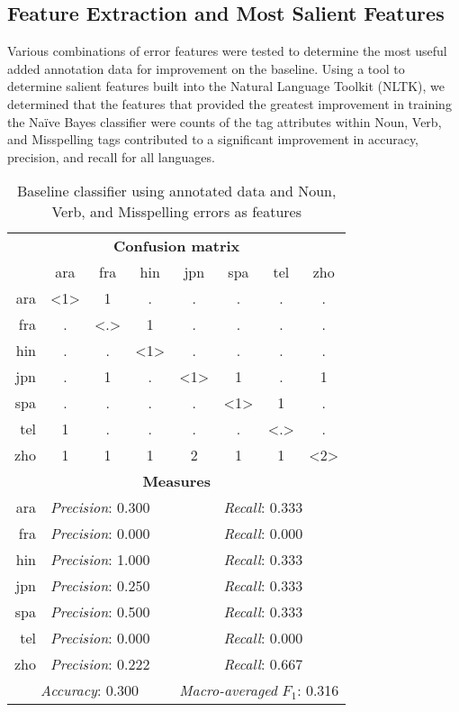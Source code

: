 \documentclass[10pt, a4paper]{article}
\begin{document}
\subsection{Feature Extraction and Most Salient Features}
Various combinations of error features were tested to determine the most useful added annotation data for improvement on the baseline. Using a tool to determine salient features built into the Natural Language Toolkit (NLTK), we determined that the features that provided the greatest improvement in training the Na\"ive Bayes classifier were counts of the tag attributes within Noun, Verb, and Misspelling tags contributed to a significant improvement in accuracy, precision, and recall for all languages. 

\begin{table}[!h]
	\begin{center}
		\begin{tabular}{r|c|c|c|c|c|c|c}	
			\multicolumn{8}{c}{\textbf{Confusion matrix}}\\
			~&ara & fra & hin & jpn & spa & tel & zho\\
			\hline
			ara & <1> & 1 & . & . & . & . & . \\
			fra & . & <.> & 1 & . & . & . & . \\
			hin & . & . & <1> & . & . & . & . \\
			jpn & . & 1 & . & <1> & 1 & . & 1 \\
			spa & . & . & . & . & <1> & 1 & . \\
			tel & 1 & . & . & . & . & <.> & . \\
			zho & 1 & 1 & 1 & 2 & 1 & 1 & <2> \\
			
			\multicolumn{8}{c}{\textbf{Measures}}\\
			ara & \multicolumn{4}{l}{\textit{Precision}: 0.300} & \multicolumn{3}{l}{\textit{Recall}: 0.333}	\\
			fra & \multicolumn{4}{l}{\textit{Precision}: 0.000} & \multicolumn{3}{l}{\textit{Recall}: 0.000}	\\
			hin & \multicolumn{4}{l}{\textit{Precision}: 1.000} & \multicolumn{3}{l}{\textit{Recall}: 0.333}	\\
			jpn & \multicolumn{4}{l}{\textit{Precision}: 0.250} & \multicolumn{3}{l}{\textit{Recall}: 0.333}	\\
			spa & \multicolumn{4}{l}{\textit{Precision}: 0.500} & \multicolumn{3}{l}{\textit{Recall}: 0.333}	\\
			tel & \multicolumn{4}{l}{\textit{Precision}: 0.000} & \multicolumn{3}{l}{\textit{Recall}: 0.000}	\\
			zho & \multicolumn{4}{l}{\textit{Precision}: 0.222} & \multicolumn{3}{l}{\textit{Recall}: 0.667}	\\
			\multicolumn{4}{c}{\textit{Accuracy}: 0.300} & \multicolumn{4}{l}{\textit{Macro-averaged }$F_1$: 0.316} 
		\end{tabular}
		\caption{Baseline classifier using annotated data and Noun, Verb, and Misspelling errors as features \label{table:bestfeatures}}
	\end{center}
\end{table}
\end{document}
